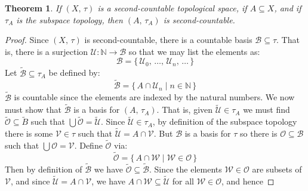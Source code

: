 \documentclass{article}
\theoremstyle{plain}
\newtheorem{theorem}{Theorem}[section]
\theoremstyle{normal}
\begin{document}
        \begin{theorem}
            If $(X,\,\tau)$ is a second-countable topological space, if
            $A\subseteq{X}$, and if $\tau_{A}$ is the subspace topology, then
            $(A,\,\tau_{A})$ is second-countable.
        \end{theorem}
        \begin{proof}
            Since $(X,\,\tau)$ is second-countable, there is a countable basis
            $\mathcal{B}\subseteq\tau$. That is, there is a surjection
            $\mathcal{U}:\mathbb{N}\rightarrow\mathcal{B}$ so that we may list
            the elements as:
            \begin{equation}
                \mathcal{B}=
                \{\,\mathcal{U}_{0},\,\dots,\,\mathcal{U}_{n},\,\dots\,\}
            \end{equation}
            Let $\tilde{\mathcal{B}}\subseteq\tau_{A}$ be defined by:
            \begin{equation}
                \tilde{\mathcal{B}}
                =\{\,A\cap\mathcal{U}_{n}\;|\;n\in\mathbb{N}\,\}
            \end{equation}
            $\tilde{\mathcal{B}}$ is countable since the elements are indexed
            by the natural numbers. We now must show that $\tilde{\mathcal{B}}$
            is a basis for $(A,\,\tau_{A})$. That is, given
            $\tilde{\mathcal{U}}\in\tau_{A}$ we must find
            $\tilde{\mathcal{O}}\subseteq\tilde{B}$ such that
            $\bigcup\tilde{\mathcal{O}}=\tilde{\mathcal{U}}$. Since
            $\tilde{\mathcal{U}}\in\tau_{A}$, by definition of the subspace
            topology there is some $\mathcal{V}\in\tau$ such that
            $\tilde{\mathcal{U}}=A\cap\mathcal{V}$. But $\mathcal{B}$ is a
            basis for $\tau$ so there is $\mathcal{O}\subseteq\mathcal{B}$
            such that $\bigcup\mathcal{O}=\mathcal{V}$. Define
            $\tilde{\mathcal{O}}$ via:
            \begin{equation}
                \tilde{\mathcal{O}}=
                \{\,A\cap\mathcal{W}\;|\;\mathcal{W}\in\mathcal{O}\,\}
            \end{equation}
            Then by definition of $\tilde{\mathcal{B}}$ we have
            $\tilde{\mathcal{O}}\subseteq\tilde{\mathcal{B}}$. Since the
            elements $\mathcal{W}\in\mathcal{O}$ are subsets of $\mathcal{V}$,
            and since $\tilde{\mathcal{U}}=A\cap\mathcal{V}$, we have
            $A\cap\mathcal{W}\subseteq\tilde{\mathcal{U}}$ for all
            $\mathcal{W}\in\mathcal{O}$, and hence

\end{proof}
\end{document}
